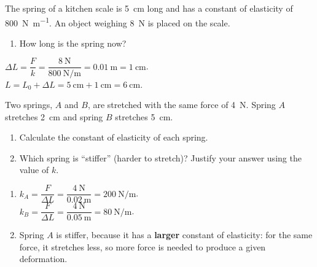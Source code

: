 \begin{exercise}
    The spring of a kitchen scale is \qty{5}{\cm} long and has a constant of elasticity of \qty{800}{\newton\per\metre}. An object weighing \qty{8}{\newton} is placed on the scale.
    \begin{enumerate}[label=\letraminuscula]
        \item How long is the spring now?
    \end{enumerate}
    \begin{solu}
        \(\Delta L = \dfrac{F}{k} = \dfrac{\qty{8}{\newton}}{\qty{800}{\newton\per\metre}} = \qty{0.01}{\m} = \qty{1}{\cm}\). \\
        \(L = L_0 + \Delta L = \qty{5}{\cm} + \qty{1}{\cm} = \qty{6}{\cm}\).
    \end{solu}
\end{exercise}

\begin{exercise}
    Two springs, \(A\) and \(B\), are stretched with the same force of \qty{4}{\newton}. Spring \(A\) stretches \qty{2}{\cm} and spring \(B\) stretches \qty{5}{\cm}.
    \begin{enumerate}[label=\letraminuscula]
        \item Calculate the constant of elasticity of each spring.
        \item Which spring is ``stiffer'' (harder to stretch)? Justify your answer using the value of \(k\).
    \end{enumerate}
    \begin{solu}
        \begin{enumerate}[label=\alph*)]
            \item \(k_A = \dfrac{F}{\Delta L} = \dfrac{\qty{4}{\newton}}{\qty{0.02}{\m}} = \qty{200}{\newton\per\metre}\). \\
            \(k_B = \dfrac{F}{\Delta L} = \dfrac{\qty{4}{\newton}}{\qty{0.05}{\m}} = \qty{80}{\newton\per\metre}\).
            \item Spring \(A\) is stiffer, because it has a \textbf{larger} constant of elasticity: for the same force, it stretches less, so more force is needed to produce a given deformation.
        \end{enumerate}
    \end{solu}
\end{exercise}

